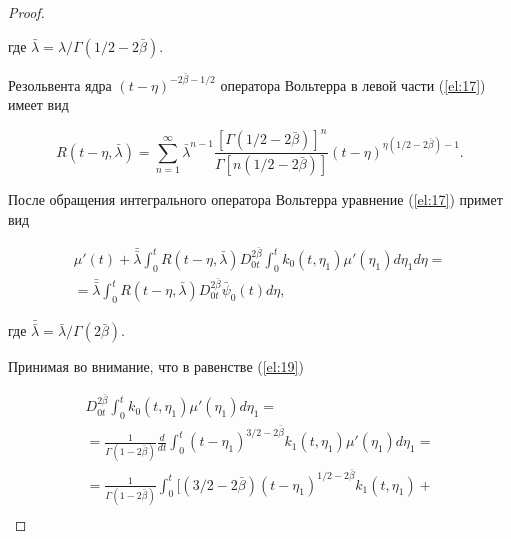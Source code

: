 \begin{proof}
\begin{equation}
\end{equation}

где $\bar{\lambda}={\lambda}/\Gamma(1/2-2\bar{\beta})$.



Резольвента ядра $(t-\eta)^{-2\bar{\beta}-1/2}$ оператора Вольтерра в левой части (\ref{el:17}) имеет вид \cite{eleevbalk:bib:Mis}

\begin{equation} \label{el:18}

R(t-\eta,\bar{\lambda})=\sum\limits_{n=1}^\infty

\bar{\lambda}^{n-1}\frac{[\Gamma(1/2-2\bar{\beta})]^{n}}{\Gamma[n(1/2-2\bar{\beta})]}(t-\eta)^{\eta(1/2-2\bar{\beta})-1}.

\end{equation}



После обращения интегрального оператора Вольтерра уравнение (\ref{el:17}) примет вид

\begin{multline} \label{el:19}

\mu'(t)+\bar{\bar{\lambda}}\int_0^tR(t-\eta,\bar{\lambda})D_{0t}^{2\bar{\beta}}\int_0^tk_0(t,\eta_1)\mu'(\eta_1)d\eta_1d\eta=

\\

=\bar{\bar{\lambda}}\int_0^tR(t-\eta,\bar{\lambda})D_{0t}^{2\bar{\beta}}\bar{\psi}_0(t)d\eta,

\end{multline}

где $\bar{\bar{\lambda}}=\bar{\lambda}/\Gamma(2\bar{\beta})$.



Принимая во внимание, что в равенстве (\ref{el:19})

\begin{multline*}

D_{0t}^{2\bar{\beta}}\int_0^tk_0(t,\eta_1)\mu'(\eta_1)d\eta_1=

\\

=\frac{1}{\Gamma(1-2\bar{\beta})}\frac{d}{dt}\int_0^t(t-\eta_1)^{3/2-2\bar{\beta}} k_1(t,\eta_1)\mu'(\eta_1)d\eta_1=

\\

=\frac{1}{\Gamma(1-2\bar{\beta})}\int_0^t[(3/2-2\bar{\beta})(t-\eta_1)^{1/2-2\bar

{\beta}}k_1(t,\eta_1)+

\\


\end{multline*}
\end{proof}
